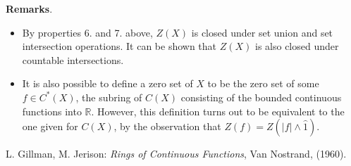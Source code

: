 \documentclass[12pt]{article}
\begin{document}
\textbf{Remarks}.  
\begin{itemize}
\item
By properties 6. and 7. above,  $Z(X)$ is closed under set union and set intersection operations.  It can be shown that $Z(X)$ is also closed under countable intersections.
\item
It is also possible to define a zero set of $X$ to be the zero set of some $f\in C^*(X)$, the subring of $C(X)$ consisting of the bounded continuous functions into $\mathbb{R}$.  However, this definition turns out to be equivalent to the one given for $C(X)$, by the observation that $Z(f)=Z(|f|\wedge \hat{1})$.
\end{itemize}

\begin{thebibliography}{7}
 L. Gillman, M. Jerison: {\em Rings of Continuous Functions}, Van Nostrand, (1960).
\end{thebibliography}
\end{document}
